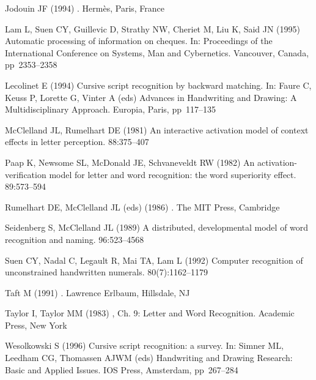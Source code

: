 \documentclass[ijdar]{svjour}
\begin{document}
\begin{thebibliography}{88}
 Jodouin JF (1994)
.
\newblock Herm\`es, Paris, France


 Lam L, Suen CY, Guillevic D, Strathy NW, Cheriet M, Liu K, Said JN (1995)
\newblock Automatic processing of information on cheques.
\newblock In: {Proceedings of the International Conference on Systems, Man and
  Cybernetics}. Vancouver, Canada, pp~2353--2358

 Lecolinet E (1994)
\newblock Cursive script recognition by backward matching.
\newblock In: Faure C, Keuss P, Lorette G, Vinter A (eds)
  {Advances in Handwriting and Drawing: A Multidisciplinary Approach}.
        Europia, Paris, pp~117--135


 McClelland JL, Rumelhart DE (1981)
\newblock An interactive activation model of context effects in letter
  perception.
 88:375--407

 Paap K, Newsome SL, McDonald JE, Schvaneveldt RW (1982)
\newblock An activation-verification model for letter and word recognition:
the
  word superiority effect.
 89:573--594

 Rumelhart DE, McClelland JL (eds) (1986)
.
\newblock The MIT Press, Cambridge


 Seidenberg S, McClelland JL (1989)
\newblock A distributed, developmental model of word recognition and naming.
 96:523--4568

 Suen CY, Nadal C, Legault R, Mai TA, Lam L (1992)
\newblock Computer recognition of unconstrained handwritten numerals.
 80(7):1162--1179

 Taft M (1991)
.
\newblock Law\-rence Erlbaum, Hillsdale, NJ

 Taylor I, Taylor MM (1983)
, Ch. 9: Letter and Word
  Recognition. Academic Press, New York

 Wesolkowski S (1996)
\newblock Cursive script recognition: a survey.
\newblock In: Simner ML, Leedham CG, Thomassen AJWM (eds)
  {Handwriting and Drawing Research: Basic and Applied Issues}.
  IOS Press, Amsterdam, pp~267--284
\end{thebibliography}
\end{document}
